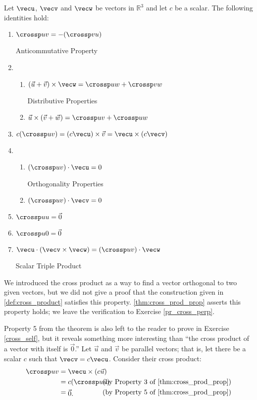 \setboxwidth{15pt}
{Let $\vecu$, $\vecv$ and $\vecw$ be vectors in $\mathbb{R}^3$ and let $c$ be a scalar. The following identities hold:
\begin{enumerate}
	\item \parbox{167pt}{$\crossp uv = -(\crossp vu)$} Anticommutative Property
	\item	\begin{enumerate}
		\item \parbox{145pt}{$(\vec u+\vec v)\times \vecw = \crossp uw+\crossp vw$} Distributive Properties
		\item	$\vec u \times (\vec v+\vec w) = \crossp uv+\crossp uw$
	\end{enumerate}
	\item		$c(\crossp uv) = (c\vecu) \times \vec v = \vecu \times (c\vecv)$
	\item		\begin{enumerate}
		\item \parbox{145pt}{$(\crossp uv)\cdot \vecu = 0$} Orthogonality Properties
		\item	$(\crossp uv)\cdot \vecv = 0$
	\end{enumerate}
	\item		$\crossp uu = \vec 0$
	\item		$\crossp u0 = \vec 0$
	\item		\parbox{167pt}{$\vecu \cdot (\vecv\times\vecw) = (\crossp uv)\cdot \vecw$} Scalar Triple Product
\end{enumerate}}

We introduced the cross product as a way to find a vector orthogonal to two given vectors, but we did not give a proof that the construction given in \autoref{def:cross_product} satisfies this property. \autoref{thm:cross_prod_prop} asserts this property holds; we leave the verification to Exercise \ref{pr_cross_perp}.

Property 5 from the theorem is also left to the reader to prove in Exercise \ref{cross_self}, but it reveals something more interesting than ``the cross product of a vector with itself is $\vec 0$.'' Let $\vec u$ and $\vec v$ be parallel vectors; that is, let there be a scalar $c$ such that $\vecv = c\vecu$. Consider their cross product:
\begin{align*}
\crossp uv &= \vecu \times (c\vec u) \\
					&=	\parbox{50pt}{$c(\crossp uu)$}\text{(by Property 3 of \autoref{thm:cross_prod_prop})}\\
					&= \parbox{50pt}{$\vec 0$.}\text{(by Property 5 of \autoref{thm:cross_prod_prop})}
\end{align*}


